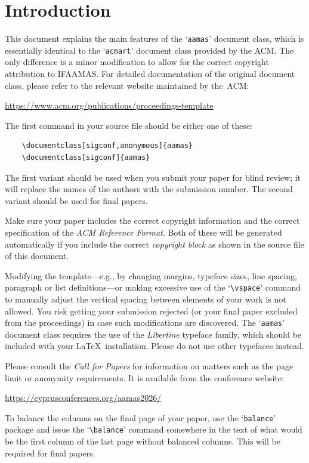 \documentclass[sigconf,anonymous]{aamas}
\begin{document}
\balance


\iffalse
\section{Introduction}

This document explains the main features of the `\texttt{aamas}' 
document class, which is essentially identical to the `\texttt{acmart}'
document class provided by the ACM. The only difference is a minor 
modification to allow for the correct copyright attribution to IFAAMAS.
For detailed documentation of the original document class, please refer
to the relevant website maintained by the~ACM:
%
\begin{center}
\url{https://www.acm.org/publications/proceedings-template}
\end{center}
%
The first command in your source file should be either one of these:
\begin{verbatim}
    \documentclass[sigconf,anonymous]{aamas}
    \documentclass[sigconf]{aamas}
\end{verbatim}
%
The first variant should be
used when you submit your paper for blind review; it will replace the names of the authors with the submission number.
The second variant should be used for final papers. 

Make sure your paper includes the correct copyright information and 
the correct specification of the \emph{ACM Reference Format}. Both of 
these will be generated automatically if you include the correct 
\emph{copyright block} as shown in the source file of this document.

Modifying the template---e.g., by changing margins, typeface sizes, 
line spacing, paragraph or list definitions---or making excessive use 
of the `\verb|\vspace|' command to manually adjust the vertical spacing 
between elements of your work is not allowed. You risk getting your 
submission rejected (or your final paper excluded from the proceedings) 
in case such modifications are discovered. The `\texttt{aamas}' document 
class requires the use of the \textit{Libertine} typeface family, which 
should be included with your \LaTeX\ installation. Please do not use 
other typefaces instead.

Please consult the \emph{Call for Papers} for information on matters 
such as the page limit or anonymity requirements. It is available from
the conference website:
%
\begin{center}
\url{https://cyprusconferences.org/aamas2026/}
\end{center}
%
To balance the columns on the final page of your paper, use the 
`\texttt{balance}' package and issue the `\verb|\balance|' command
 somewhere in the text of what would be the first column of the last 
 page without balanced columns. This will be required for final papers.
\end{document}
